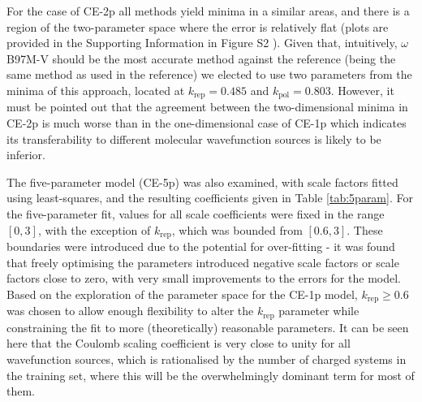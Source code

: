 \documentclass[preprint]{iucr}              %
\begin{document}
For the case of CE-2p all methods yield minima in a similar areas, and there is a region of the two-parameter space where the error is relatively flat
(plots are provided in the Supporting Information in Figure S2 %
).
Given that, intuitively, $\omega$B97M-V should be the most accurate method against the reference (being the same method as used in the reference)
we elected to use two parameters from the minima of this approach, located at $k_\text{rep} = 0.485$ and $k_\text{pol} = 0.803$.
However, it must be pointed out that the agreement between the two-dimensional minima in CE-2p is much worse than in the one-dimensional case
of CE-1p which indicates its transferability to different molecular wavefunction sources is likely to be inferior.

The five-parameter model (CE-5p) was also examined, with scale factors fitted using least-squares,
and the resulting coefficients given in Table \ref{tab:5param}. For the five-parameter fit, values for all 
scale coefficients were fixed in the range $[0, 3]$, with the exception of $k_\text{rep}$, which was bounded from $[0.6,3]$.
These boundaries were introduced due to the potential for over-fitting - it was found that freely optimising the parameters
introduced negative scale factors or scale factors close to zero, with very small improvements to the errors for the model.
Based on the exploration of the parameter space for the CE-1p model, $k_\text{rep} \ge 0.6$ was chosen to allow enough
flexibility to alter the $k_\text{rep}$ parameter while constraining the fit to more (theoretically) reasonable parameters.
It can be seen here that the Coulomb scaling coefficient is very close to unity for all wavefunction sources, which is rationalised by 
the number of charged systems in the training set, where this will be the overwhelmingly dominant term for most of them.
\end{document}
